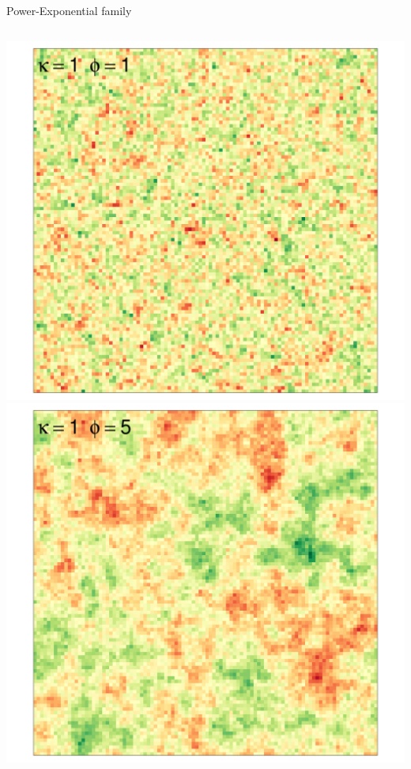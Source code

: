 \documentclass[
  ignorenonframetext,
]{beamer}
\begin{document}
\begin{frame}{Power-Exponential family}
\small

\begin{columns}[T]
\begin{column}{0.33\textwidth}
\includegraphics{Lecture_1_files/figure-beamer/unnamed-chunk-12-1.pdf}
\includegraphics{Lecture_1_files/figure-beamer/unnamed-chunk-13-1.pdf}
\end{column}


\end{columns}
\end{frame}
\end{document}
